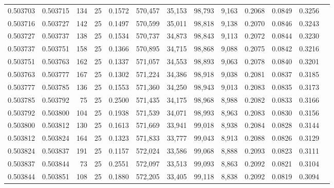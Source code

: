 \begin{tabular}{rrrrrrrrrrrrr}
0.503703 & 0.503715 & 134 &  25 &                                     0.1572 & 570,457 &  35,153 &  98,793 &   9,163 & 0.2068 & 0.0849 & 0.3256 \\
0.503716 & 0.503727 & 142 &  25 &                                     0.1497 & 570,599 &  35,011 &  98,818 &   9,138 & 0.2070 & 0.0846 & 0.3243 \\
0.503727 & 0.503737 & 138 &  25 &                                     0.1534 & 570,737 &  34,873 &  98,843 &   9,113 & 0.2072 & 0.0844 & 0.3230 \\
0.503737 & 0.503751 & 158 &  25 &                                     0.1366 & 570,895 &  34,715 &  98,868 &   9,088 & 0.2075 & 0.0842 & 0.3216 \\
0.503751 & 0.503763 & 162 &  25 &                                     0.1337 & 571,057 &  34,553 &  98,893 &   9,063 & 0.2078 & 0.0840 & 0.3201 \\
0.503763 & 0.503777 & 167 &  25 &                                     0.1302 & 571,224 &  34,386 &  98,918 &   9,038 & 0.2081 & 0.0837 & 0.3185 \\
0.503777 & 0.503785 & 136 &  25 &                                     0.1553 & 571,360 &  34,250 &  98,943 &   9,013 & 0.2083 & 0.0835 & 0.3173 \\
0.503785 & 0.503792 &  75 &  25 &                                     0.2500 & 571,435 &  34,175 &  98,968 &   8,988 & 0.2082 & 0.0833 & 0.3166 \\
0.503792 & 0.503800 & 104 &  25 &                                     0.1938 & 571,539 &  34,071 &  98,993 &   8,963 & 0.2083 & 0.0830 & 0.3156 \\
0.503800 & 0.503812 & 130 &  25 &                                     0.1613 & 571,669 &  33,941 &  99,018 &   8,938 & 0.2084 & 0.0828 & 0.3144 \\
0.503812 & 0.503824 & 164 &  25 &                                     0.1323 & 571,833 &  33,777 &  99,043 &   8,913 & 0.2088 & 0.0826 & 0.3129 \\
0.503824 & 0.503837 & 191 &  25 &                                     0.1157 & 572,024 &  33,586 &  99,068 &   8,888 & 0.2093 & 0.0823 & 0.3111 \\
0.503837 & 0.503844 &  73 &  25 &                                     0.2551 & 572,097 &  33,513 &  99,093 &   8,863 & 0.2092 & 0.0821 & 0.3104 \\
0.503844 & 0.503851 & 108 &  25 &                                     0.1880 & 572,205 &  33,405 &  99,118 &   8,838 & 0.2092 & 0.0819 & 0.3094 \\

\end{tabular}
